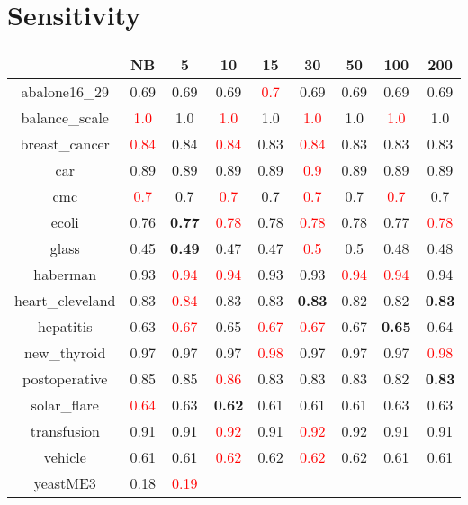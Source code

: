 \documentclass{article}%
\begin{document}
\section*{Sensitivity}%
\begin{tabular}{c|cccccccc}%
\hline%
&NB&5&10&15&30&50&100&200\\%
\hline%
abalone16\_29&0.69&0.69&0.69&\textcolor{red}{ 
0.7
}&0.69&0.69&0.69&0.69\\%
\hline%
balance\_scale&\textcolor{red}{ 
1.0
}&1.0&\textcolor{red}{ 
1.0
}&1.0&\textcolor{red}{ 
1.0
}&1.0&\textcolor{red}{ 
1.0
}&1.0\\%
\hline%
breast\_cancer&\textcolor{red}{ 
0.84
}&0.84&\textcolor{red}{ 
0.84
}&0.83&\textcolor{red}{ 
0.84
}&0.83&0.83&0.83\\%
\hline%
car&0.89&0.89&0.89&0.89&\textcolor{red}{ 
0.9
}&0.89&0.89&0.89\\%
\hline%
cmc&\textcolor{red}{ 
0.7
}&0.7&\textcolor{red}{ 
0.7
}&0.7&\textcolor{red}{ 
0.7
}&0.7&\textcolor{red}{ 
0.7
}&0.7\\%
\hline%
ecoli&0.76&\textbf{0.77}&\textcolor{red}{ 
0.78
}&0.78&\textcolor{red}{ 
0.78
}&0.78&0.77&\textcolor{red}{ 
0.78
}\\%
\hline%
glass&0.45&\textbf{0.49}&0.47&0.47&\textcolor{red}{ 
0.5
}&0.5&0.48&0.48\\%
\hline%
haberman&0.93&\textcolor{red}{ 
0.94
}&\textcolor{red}{ 
0.94
}&0.93&0.93&\textcolor{red}{ 
0.94
}&\textcolor{red}{ 
0.94
}&0.94\\%
\hline%
heart\_cleveland&0.83&\textcolor{red}{ 
0.84
}&0.83&0.83&\textbf{0.83}&0.82&0.82&\textbf{0.83}\\%
\hline%
hepatitis&0.63&\textcolor{red}{ 
0.67
}&0.65&\textcolor{red}{ 
0.67
}&\textcolor{red}{ 
0.67
}&0.67&\textbf{0.65}&0.64\\%
\hline%
new\_thyroid&0.97&0.97&0.97&\textcolor{red}{ 
0.98
}&0.97&0.97&0.97&\textcolor{red}{ 
0.98
}\\%
\hline%
postoperative&0.85&0.85&\textcolor{red}{ 
0.86
}&0.83&0.83&0.83&0.82&\textbf{0.83}\\%
\hline%
solar\_flare&\textcolor{red}{ 
0.64
}&0.63&\textbf{0.62}&0.61&0.61&0.61&0.63&0.63\\%
\hline%
transfusion&0.91&0.91&\textcolor{red}{ 
0.92
}&0.91&\textcolor{red}{ 
0.92
}&0.92&0.91&0.91\\%
\hline%
vehicle&0.61&0.61&\textcolor{red}{ 
0.62
}&0.62&\textcolor{red}{ 
0.62
}&0.62&0.61&0.61\\%
\hline%
yeastME3&0.18&\textcolor{red}{ 
0.19
}
\end{tabular}
\end{document}
